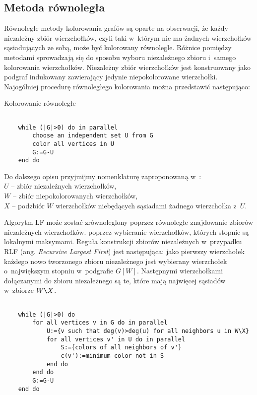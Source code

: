 \documentclass{article}
\begin{document}
	\subsection{Metoda równoległa}
	Równoległe metody kolorowania grafów są oparte na obserwacji, że każdy niezależny zbiór wierzchołków, czyli taki w~którym nie ma żadnych wierzchołków sąsiadujących ze sobą, może być kolorowany równolegle. Różnice pomiędzy metodami sprowadzają się do sposobu wyboru niezależnego zbioru i~samego kolorowania wierzchołków. Niezależny zbiór wierzchołków jest konstruowany jako podgraf indukowany zawierający jedynie niepokolorowane wierzchołki. Najogólniej procedurę równoległego kolorowania można przedstawić następująco:\\
	\begin{algorithm}[H]
		\SetAlgoLined
	\caption{Kolorowanie równoległe}
\end{algorithm}
	\begin{lstlisting}
	
	while (|G|>0) do in parallel
		choose an independent set U from G
		color all vertices in U
		G:=G-U
	end do
	\end{lstlisting}
	
	Do dalszego opisu przyjmijmy nomenklaturę zaproponowaną w~\cite{gis}:\\
	$U$ -- zbiór niezależnych wierzchołków,\\
	$W$ -- zbiór niepokolorowanych wierzchołków,\\
	$X$ -- podzbiór $W$ wierzchołków niebędących sąsiadami żadnego wierzchołka z~$U$.
	
	Algorytm LF może zostać zrównoleglony poprzez równoległe znajdowanie zbiorów niezależnych wierzchołków. poprzez wybieranie wierzchołków, których stopnie są lokalnymi maksymami.
	Reguła konstrukcji zbiorów niezależnych w~przypadku RLF (ang. \textit{Recursive Largest First}) jest następująca: jako pierwszy wierzchołek każdego nowo tworzonego zbioru niezależnego jest wybierany wierzchołek o~największym stopniu w~podgrafie $G[W]$. Następnymi wierzchołkami dołączanymi do zbioru niezależnego są te, które mają najwięcej sąsiadów w~zbiorze $W\verb|\|X$.
	\begin{lstlisting}
	
	while (|G|>0) do
		for all vertices v in G do in parallel
			U:={v such that deg(v)>deg(u) for all neighbors u in W\X}
			for all vertices v' in U do in parallel
				S:={colors of all neighbors of v'}
				c(v'):=minimum color not in S
			end do
		end do
		G:=G-U
	end do
	\end{lstlisting}
\end{document}
